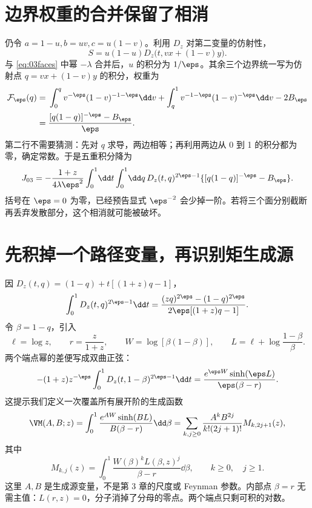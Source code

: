 \section{边界权重的合并保留了相消}
仍令 $a=1-u,b=uv,c=u(1-v)$。利用 $D_z$ 对第二变量的仿射性，
\[
S=u(1-u)D_z\bigl(t,vx+(1-v)y\bigr).
\]
与 \eqref{eq:03faces} 中幂 $-\lambda$ 合并后，$u$ 的积分为 $1/\eps$。其余三个边界统一写为仿射点 $q=vx+(1-v)y$ 的积分，权重为
\begin{equation}
\begin{aligned}
\mathcal F_\eps(q)={}&\int_0^q v^{-\eps}(1-v)^{-1-\eps}\dd v
+\int_q^1v^{-1-\eps}(1-v)^{-\eps}\dd v-2B_\eps\\
={}&\frac{[q(1-q)]^{-\eps}-B_\eps}{\eps}.
\end{aligned}
\label{eq:Fq}
\end{equation}
第二行不需要猜测：先对 $q$ 求导，两边相等；再利用两边从 0 到 1 的积分都为零，确定常数。于是五重积分降为
\begin{equation}
J_{03}=-\frac{1+z}{4\lambda\eps^2}
\int_0^1\!\dd t\int_0^1\!\dd q\,
D_z(t,q)^{2\eps-1}
\{[q(1-q)]^{-\eps}-B_\eps\}.
\label{eq:J03two}
\end{equation}
括号在 $\eps=0$ 为零，已经预告显式 $\eps^{-2}$ 会少掉一阶。若将三个面分别截断再丢弃发散部分，这个相消就可能被破坏。

\section{先积掉一个路径变量，再识别矩生成源}
因 $D_z(t,q)=(1-q)+t[(1+z)q-1]$，
\begin{equation}
\int_0^1D_z(t,q)^{2\eps-1}\dd t
=\frac{(zq)^{2\eps}-(1-q)^{2\eps}}{2\eps[(1+z)q-1]}.
\end{equation}
令 $\beta=1-q$，引入
\begin{equation}
\ell=\log z,\qquad r=\frac{z}{1+z},\qquad
W=\log[\beta(1-\beta)],\qquad
L=\ell+\log\frac{1-\beta}{\beta}.
\end{equation}
两个端点幂的差便写成双曲正弦：
\begin{equation}
-(1+z)z^{-\eps}\int_0^1D_z(t,1-\beta)^{2\eps-1}\dd t
=\frac{e^{\eps W}\sinh(\eps L)}{\eps(\beta-r)}.
\end{equation}
这提示我们定义一次覆盖所有展开阶的生成函数
\begin{equation}
\VM(A,B;z)=\int_0^1
\frac{e^{AW}\sinh(BL)}{B(\beta-r)}\dd\beta
=\sum_{k,j\ge0}\frac{A^kB^{2j}}{k!(2j+1)!}M_{k,2j+1}(z),
\label{eq:VM}
\end{equation}
其中
\begin{equation}
\boxed{M_{k,j}(z)=\int_0^1\frac{W(\beta)^kL(\beta,z)^j}{\beta-r}\dd\beta,
\qquad k\ge0,\quad j\ge1.}
\label{eq:Mdef}
\end{equation}
这里 $A,B$ 是生成源变量，不是第 3 章的尺度或 Feynman 参数。内部点 $\beta=r$ 无需主值：$L(r,z)=0$，分子消掉了分母的零点。两个端点只剩可积的对数。

